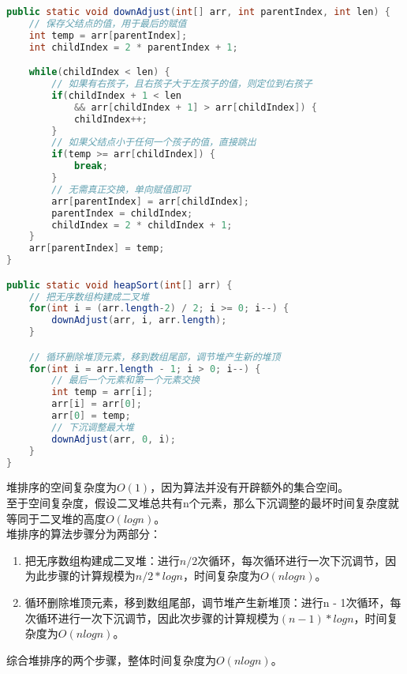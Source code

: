 \vspace{0.5cm}


\begin{lstlisting}[language=Java]
public static void downAdjust(int[] arr, int parentIndex, int len) {
    // 保存父结点的值，用于最后的赋值
    int temp = arr[parentIndex];
    int childIndex = 2 * parentIndex + 1;

    while(childIndex < len) {
        // 如果有右孩子，且右孩子大于左孩子的值，则定位到右孩子
        if(childIndex + 1 < len 
            && arr[childIndex + 1] > arr[childIndex]) {
            childIndex++;
        }
        // 如果父结点小于任何一个孩子的值，直接跳出
        if(temp >= arr[childIndex]) {
            break;
        }
        // 无需真正交换，单向赋值即可
        arr[parentIndex] = arr[childIndex];
        parentIndex = childIndex;
        childIndex = 2 * childIndex + 1;
    }
    arr[parentIndex] = temp;
}

public static void heapSort(int[] arr) {
    // 把无序数组构建成二叉堆
    for(int i = (arr.length-2) / 2; i >= 0; i--) {
        downAdjust(arr, i, arr.length);
    }

    // 循环删除堆顶元素，移到数组尾部，调节堆产生新的堆顶
    for(int i = arr.length - 1; i > 0; i--) {
        // 最后一个元素和第一个元素交换
        int temp = arr[i];
        arr[i] = arr[0];
        arr[0] = temp;
        // 下沉调整最大堆
        downAdjust(arr, 0, i);
    }
}
\end{lstlisting}

堆排序的空间复杂度为$ O(1) $，因为算法并没有开辟额外的集合空间。\\

至于空间复杂度，假设二叉堆总共有n个元素，那么下沉调整的最坏时间复杂度就等同于二叉堆的高度$ O(logn) $。\\

堆排序的算法步骤分为两部分：

\begin{enumerate}
	\item 把无序数组构建成二叉堆：进行$ n / 2 $次循环，每次循环进行一次下沉调节，因为此步骤的计算规模为$ n/2 * logn $，时间复杂度为$ O(nlogn) $。

	\item 循环删除堆顶元素，移到数组尾部，调节堆产生新堆顶：进行n - 1次循环，每次循环进行一次下沉调节，因此次步骤的计算规模为$ (n-1) * logn $，时间复杂度为$ O(nlogn) $。
\end{enumerate}

综合堆排序的两个步骤，整体时间复杂度为$ O(nlogn) $。

\newpage